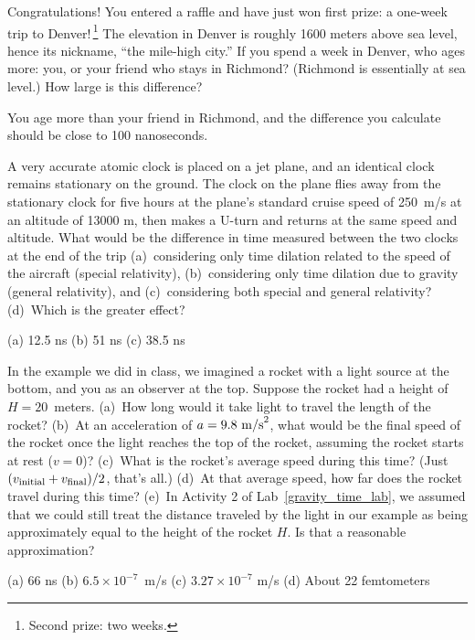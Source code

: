 \begin{Exercise}[difficulty=0]
Congratulations!  You entered a raffle and have just won first prize: a one-week trip to Denver!\,\footnote{Second prize: two weeks.}  The elevation in Denver is roughly 1600 meters above sea level, hence its nickname, ``the mile-high city.''  If you spend a week in Denver, who ages more: you, or your friend who stays in Richmond? (Richmond is essentially at sea level.)  How large is this difference?
\end{Exercise}
\begin{Answer}
You age more than your friend in Richmond, and the difference you calculate should be close to 100 nanoseconds.
\end{Answer}

\begin{Exercise}[difficulty=0]
A very accurate atomic clock is placed on a jet plane, and an identical clock remains stationary on the ground.  The clock on the plane flies away from the stationary clock for five hours at the plane's standard cruise speed of 250~m/s at an altitude of 13000 m, then makes a U-turn and returns at the same speed and altitude.  What would be the difference in time measured between the two clocks at the end of the trip (a)~considering only time dilation related to the speed of the aircraft (special relativity), (b)~considering only time dilation due to gravity (general relativity), and (c)~considering both special and general relativity?  (d)~Which is the greater effect?
\end{Exercise}
\begin{Answer}
(a) 12.5 ns (b) 51 ns (c) 38.5 ns
\end{Answer}


\begin{Exercise}[difficulty=0]
\label{how_far_does_rocket_travel_prob}
In the example we did in class, we imagined a rocket with a light source at the bottom, and you as an observer at the top.  Suppose the rocket had a height of $H=20$~meters.  (a)~How long would it take light to travel the length of the rocket?  (b)~At an acceleration of $a=9.8~{\rm m/s}^2$, what would be the final speed of the rocket once the light reaches the top of the rocket, assuming the rocket starts at rest ($v=0$)?  (c)~What is the rocket's average speed during this time?  (Just $(v_{\rm initial} +v_{\rm final})/2$, that's all.)  (d)~At that average speed, how far does the rocket travel during this time?  (e)~In Activity 2 of Lab~\ref{gravity_time_lab}, we assumed that we could still treat the distance traveled by the light in our example as being approximately equal to the height of the rocket $H$.  Is that a reasonable approximation? 
\end{Exercise}
\begin{Answer}
(a) 66 ns (b) $6.5 \times 10^{-7}$~m/s (c) $3.27 \times 10^{-7}$ m/s (d) About 22 femtometers
\end{Answer}


